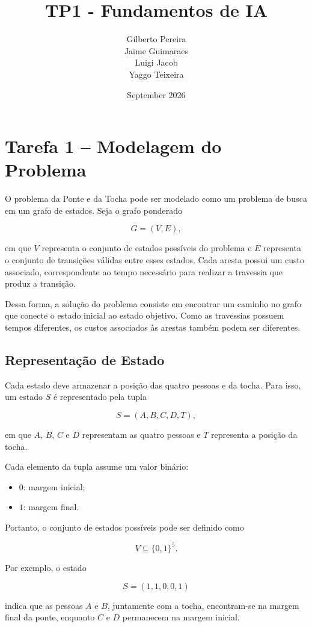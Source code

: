 \documentclass{article}
\title{TP1 - Fundamentos de IA}
\author{
    Gilberto Pereira \\
    Jaime Guimaraes \\
    Luigi Jacob \\
    Yaggo Teixeira 
}
\date{September 2026}
\begin{document}
\maketitle

\section{Tarefa 1 -- Modelagem do Problema}

O problema da Ponte e da Tocha pode ser modelado como um problema de busca em um grafo de estados. Seja o grafo ponderado

\[
G = (V,E),
\]

em que $V$ representa o conjunto de estados possíveis do problema e $E$ representa o conjunto de transições válidas entre esses estados. Cada aresta possui um custo associado, correspondente ao tempo necessário para realizar a travessia que produz a transição.

Dessa forma, a solução do problema consiste em encontrar um caminho no grafo que conecte o estado inicial ao estado objetivo. Como as travessias possuem tempos diferentes, os custos associados às arestas também podem ser diferentes.

\subsection{Representação de Estado}

Cada estado deve armazenar a posição das quatro pessoas e da tocha. Para isso, um estado $S$ é representado pela tupla

\[
S = (A,B,C,D,T),
\]

em que $A$, $B$, $C$ e $D$ representam as quatro pessoas e $T$ representa a posição da tocha.

Cada elemento da tupla assume um valor binário:

\begin{itemize}
    \item $0$: margem inicial;
    \item $1$: margem final.
\end{itemize}

Portanto, o conjunto de estados possíveis pode ser definido como

\[
V \subseteq \{0,1\}^{5}.
\]

Por exemplo, o estado

\[
S = (1,1,0,0,1)
\]

indica que as pessoas $A$ e $B$, juntamente com a tocha, encontram-se na margem final da ponte, enquanto $C$ e $D$ permanecem na margem inicial.
\end{document}
